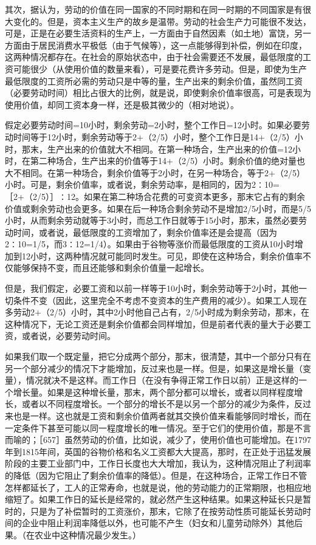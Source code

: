 其次，据认为，劳动的价值在同一国家的不同时期和在同一时期的不同国家是有很大变化的。但是，资本主义生产的故乡是温带。劳动的社会生产力可能很不发达，可是，正是在必要生活资料的生产上，一方面由于自然因素（如土地）富饶，另一方面由于居民消费水平极低（由于气候等），这一点能够得到补偿，例如在印度，这两种情况都存在。在社会的原始状态中，由于社会需要还不发展，最低限度的工资可能很少（从使用价值的数量来看），可是要花费许多劳动。但是，即使为生产最低限度的工资所必需的劳动只是中等的量，生产出来的剩余价值，虽然同工资（必要劳动时间）相比占很大的比例，就是说，即使剩余价值率很高，可是表现为使用价值，却同工资本身一样，还是极其微少的（相对地说）。

假定必要劳动时间=10小时，剩余劳动=2小时，整个工作日=12小时。如果必要劳动时间等于12小时，剩余劳动等于2+（2/5）小时，整个工作日是14+（2/5）小时，那末，生产出来的价值就大不相同。在第一种场合，生产出来的价值=12小时，在第二种场合，生产出来的价值等于14+（2/5）小时。剩余价值的绝对量也大不相同。在第一种场合，剩余价值等于2小时，在另一种场合，等于2+（2/5）小时。可是，剩余价值率，或者说，剩余劳动率，是相同的，因为2∶10=［2+（2/5）］∶12。如果在第二种场合花费的可变资本更多，那末它占有的剩余价值或剩余劳动也会更多。如果在后一种场合剩余劳动不是增加2/5小时，而是5/5小时，从而剩余劳动就等于3小时，而总工作日就等于15小时，那末，虽然必要劳动时间，或者说，最低限度的工资增加了，剩余价值率还是会提高（因为2∶10=1/5，而3∶12=1/4）。如果由于谷物等涨价而最低限度的工资从10小时增加到12小时，这两种情况就可能同时发生。可见，即使在这种场合，剩余价值率不仅能够保持不变，而且还能够和剩余价值量一起增长。

但是，我们假定，必要工资和以前一样等于10小时，剩余劳动等于2小时，其他一切条件不变（因此，这里完全不考虑不变资本的生产费用的减少）。如果工人现在多劳动2+（2/5）小时，其中2小时他自己占有，2/5小时成为剩余劳动，那末，在这种情况下，无论工资还是剩余价值都会同样增加，但是前者代表的量大于必要工资，或者说，必要劳动时间。

如果我们取一个既定量，把它分成两个部分，那末，很清楚，其中一个部分只有在另一个部分减少的情况下才能增加，反过来也是一样。但是，如果这是增长量（变量），情况就决不是这样。而工作日（在没有争得正常工作日以前）正是这样的一个增长量。如果是这种增长量，那末，两个部分都可以增长，或者以同样程度增长，或者以不同程度增长。一个部分的增长不是以另一个部分的减少为条件，反过来也是一样。这也就是工资和剩余价值两者就其交换价值来看能够同时增长，而在一定条件下甚至可能以同一程度增长的唯一情况。至于它们的使用价值，那是不言而喻的；［657］虽然劳动的价值，比如说，减少了，使用价值也可能增加。在1797年到1815年间，英国的谷物价格和名义工资都大大提高，那时，在正处于迅猛发展阶段的主要工业部门中，工作日长度也大大增加，我认为，这种情况阻止了利润率的降低（因为它阻止了剩余价值率的降低）。但是，在这种场合，正常工作日不管怎样都延长了，工人的正常寿命，也就是说，他的劳动能力的正常期限，也相应地缩短了。如果工作日的延长是经常的，就必然产生这种结果。如果这种延长只是暂时的，只是为了补偿暂时的工资涨价，那末，它除了在按劳动性质可能延长劳动时间的企业中阻止利润率降低以外，也可能不产生（妇女和儿童劳动除外）其他后果。（在农业中这种情况最少发生。）

